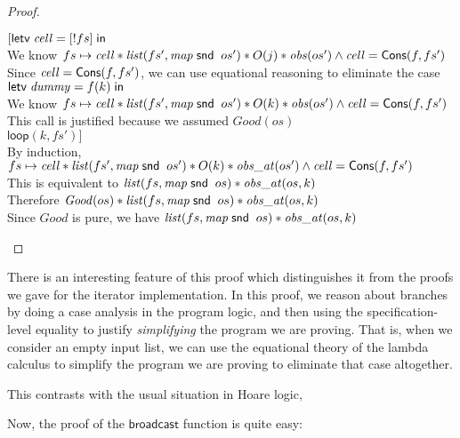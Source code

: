 \begin{proof}
\begin{tabbedproof}
\ooo $[\mathsf{letv}\;\mathit{cell} = [!fs]\;\mathsf{in}\;$ \\
\ooo We know $fs \mapsto \mathit{cell}  * \mathit{list}(fs',  \mathit{map}\;\mathsf{snd}\;\;os') * O(j) * \mathit{obs}( os') \land \mathit{cell} = \mathsf{Cons}(f, fs')$ \\
\ooo Since $\mathit{cell} = \mathsf{Cons}(f, fs')$, we can use equational reasoning to eliminate the case \\
\ooo $\mathsf{letv}\;\mathit{dummy} = f(k)\;\mathsf{in}\;$ \\
\ooo We know $fs \mapsto \mathit{cell}  * \mathit{list}(fs',  \mathit{map}\;\mathsf{snd}\;\;os') * O(k) * \mathit{obs}( os') \land \mathit{cell} = \mathsf{Cons}(f, fs')$ \\
\ooo This call is justified because we assumed $\mathit{Good}(os)$ \\
\ooo $\mathsf{loop}(k, fs')]$\\
\ooo By induction, $fs \mapsto \mathit{cell}  * \mathit{list}(fs',  \mathit{map}\;\mathsf{snd}\;\;os') * O(k) * \mathit{obs\_at}( os') \land \mathit{cell} = \mathsf{Cons}(f, fs')$ \\
\ooo This is equivalent to $\mathit{list}(fs, \mathit{map}\;\mathsf{snd}\;\;os) * \mathit{obs\_at}(os, k)$ \\
\oo Therefore $\mathit{Good}(os) * \mathit{list}(fs, \mathit{map}\;\mathsf{snd}\;\;os) * \mathit{obs\_at}(os, k)$ \\
\oo Since $\mathit{Good}$ is pure, we have $\mathit{list}(fs, \mathit{map}\;\mathsf{snd}\;\;os) * \mathit{obs\_at}(os, k)$
\end{tabbedproof}
\end{proof}

There is an interesting feature of this proof which distinguishes it
from the proofs we gave for the iterator implementation. In this
proof, we reason about branches by doing a case analysis in the
program logic, and then using the specification-level equality to
justify \emph{simplifying} the program we are proving. That is, when
we consider an empty input list, we can use the equational theory of
the lambda calculus to simplify the program we are proving to
eliminate that case altogether.

This contrasts with the usual situation in Hoare logic, 




Now, the proof of the $\mathsf{broadcast}$ function is quite easy: 

